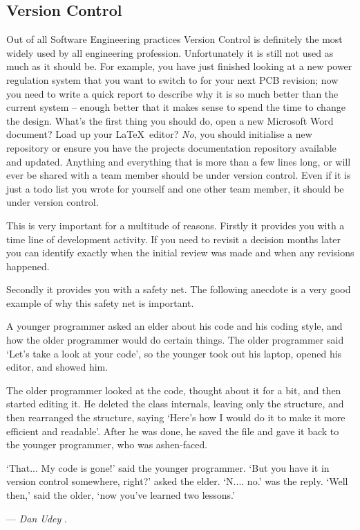 \subsection{Version Control}

  Out of all Software Engineering practices Version Control is definitely the
  most widely used by all engineering profession.  Unfortunately it is still not
  used as much as it should be.  For example, you have just finished looking at
  a new power regulation system that you want to switch to for your next PCB
  revision; now you need to write a quick report to describe why it is so much
  better than the current system -- enough better that it makes sense to spend
  the time to change the design.  What's the first thing you should do, open a
  new Microsoft Word document?  Load up your \LaTeX\ editor?  \emph{No}, you
  should initialise a new repository or ensure you have the projects
  documentation repository available and updated.  Anything and everything that
  is more than a few lines long, or will ever be shared with a team member
  should be under version control.  Even if it is just a todo list you wrote for
  yourself and one other team member, it should be under version control.

  This is very important for a multitude of reasons.  Firstly it provides you
  with a time line of development activity.  If you need to revisit a decision
  months later you can identify exactly when the initial review was made and
  when any revisions happened.

  Secondly it provides you with a safety net.  The following anecdote is a
  very good example of why this safety net is important.

  \begin{bigquote}

    {A younger programmer asked an elder about his code and his coding style,
    and how the older programmer would do certain things. The older programmer
    said `Let's take a look at your code', so the younger took out his laptop,
    opened his editor, and showed him.}

    \vspace{5pt}

    {The older programmer looked at the code, thought about it for a bit, and
    then started editing it. He deleted the class internals, leaving only the
    structure, and then rearranged the structure, saying `Here's how I would
    do it to make it more efficient and readable'. After he was done, he saved
    the file and gave it back to the younger programmer, who was ashen-faced.}

    \vspace{5pt}

    {`That... My code is gone!' said the younger programmer. `But you have it
    in version control somewhere, right?' asked the elder. `N.... no.' was the
    reply. `Well then,' said the older, `now you've learned two lessons.'}

    \vspace{5pt}

    --- \emph{Dan Udey} \cite{Udey_2008}.

  \end{bigquote}

